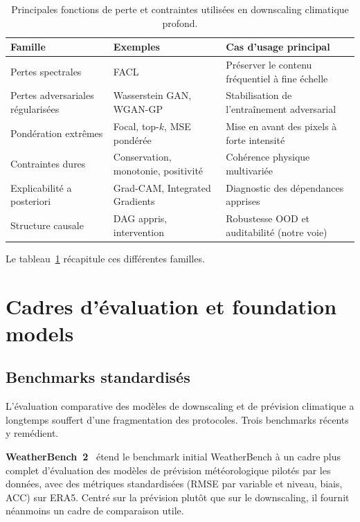 \documentclass[14pt,a4paper,openany]{extreport}
\theoremstyle{definition}
\begin{document}
\begin{table}[ht]
  \centering
  \small
  \caption{Principales fonctions de perte et contraintes utilisées en downscaling climatique profond.}
  \label{tab:pertes}
  \begin{tabular}{p{3.5cm} p{4cm} p{6cm}}
    \toprule
    \textbf{Famille} & \textbf{Exemples} & \textbf{Cas d'usage principal} \\
    \midrule
    Pertes spectrales & FACL & Préserver le contenu fréquentiel à fine échelle\\
    Pertes adversariales régularisées & Wasserstein GAN, WGAN-GP & Stabilisation de l'entraînement adversarial\\
    Pondération extrêmes & Focal, top-$k$, MSE pondérée & Mise en avant des pixels à forte intensité\\
    Contraintes dures & Conservation, monotonie, positivité & Cohérence physique multivariée\\
    Explicabilité a posteriori & Grad-CAM, Integrated Gradients & Diagnostic des dépendances apprises\\
    Structure causale & DAG appris, intervention & Robustesse OOD et auditabilité (notre voie)\\
    \bottomrule
  \end{tabular}
\end{table}

Le tableau~\ref{tab:pertes} récapitule ces différentes familles.

\section{Cadres d'évaluation et foundation models}
\label{sec:soa-benchmarks}

\subsection{Benchmarks standardisés}
\label{ssec:soa-benchmarks-std}

L'évaluation comparative des modèles de downscaling et de prévision climatique a longtemps souffert d'une fragmentation des protocoles. Trois benchmarks récents y remédient.

\textbf{WeatherBench~2}~\cite{rasp_weatherbench2_2023} étend le benchmark initial WeatherBench à un cadre plus complet d'évaluation des modèles de prévision météorologique pilotés par les données, avec des métriques standardisées (RMSE par variable et niveau, biais, ACC) sur ERA5. Centré sur la prévision plutôt que sur le downscaling, il fournit néanmoins un cadre de comparaison utile.
\end{document}
